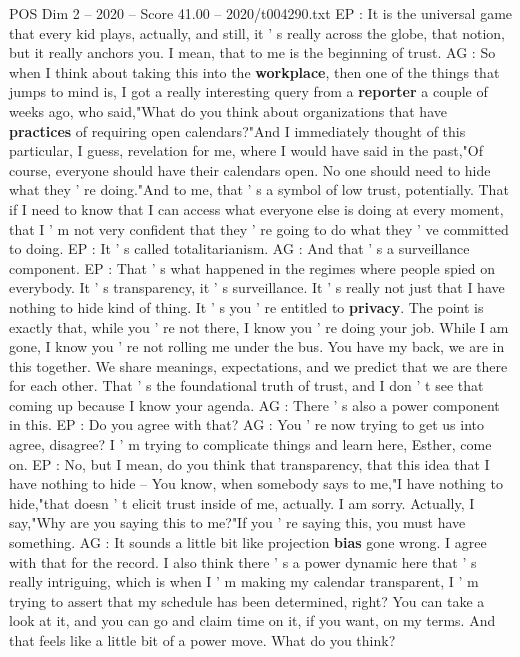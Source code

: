 \begin{textsample}{POS Dim 2 – 2020 – Score 41.00 – 2020/t004290.txt}
EP : It is the universal game that every kid plays, actually, and still, it ' s really across the globe, that notion, but it really anchors you.
I mean, that to me is the beginning of trust.
AG : So when I think about taking this into the \textbf{workplace}, then one of the things that jumps to mind is, I got a really interesting query from a \textbf{reporter} a couple of weeks ago, who said,"What do you think about organizations that have \textbf{practices} of requiring open calendars?"And I immediately thought of this particular, I guess, revelation for me, where I would have said in the past,"Of course, everyone should have their calendars open.
No one should need to hide what they ' re doing."And to me, that ' s a symbol of low trust, potentially.
That if I need to know that I can access what everyone else is doing at every moment, that I ' m not very confident that they ' re going to do what they ' ve committed to doing.
EP : It ' s called totalitarianism.
AG : And that ' s a surveillance component.
EP : That ' s what happened in the regimes where people spied on everybody.
It ' s transparency, it ' s surveillance.
It ' s really not just that I have nothing to hide kind of thing.
It ' s you ' re entitled to \textbf{privacy}.
The point is exactly that, while you ' re not there, I know you ' re doing your job.
While I am gone, I know you ' re not rolling me under the bus.
You have my back, we are in this together.
We share meanings, expectations, and we predict that we are there for each other.
That ' s the foundational truth of trust, and I don ' t see that coming up because I know your agenda.
AG : There ' s also a power component in this.
EP : Do you agree with that?
AG : You ' re now trying to get us into agree, disagree?
I ' m trying to complicate things and learn here, Esther, come on.
EP : No, but I mean, do you think that transparency, that this idea that I have nothing to hide -- You know, when somebody says to me,"I have nothing to hide,"that doesn ' t elicit trust inside of me, actually.
I am sorry.
Actually, I say,"Why are you saying this to me?"If you ' re saying this, you must have something.
AG : It sounds a little bit like projection \textbf{bias} gone wrong.
I agree with that for the record.
I also think there ' s a power dynamic here that ' s really intriguing, which is when I ' m making my calendar transparent, I ' m trying to assert that my schedule has been determined, right?
You can take a look at it, and you can go and claim time on it, if you want, on my terms.
And that feels like a little bit of a power move.
What do you think?

\end{textsample}
